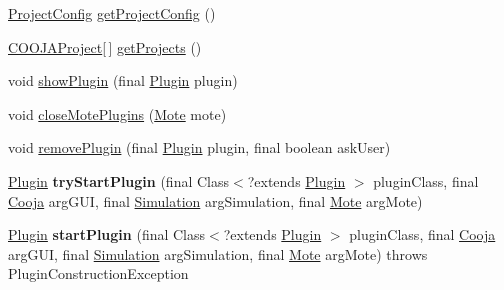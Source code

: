 \begin{DoxyCompactItemize}
\item 
\hyperlink{classorg_1_1contikios_1_1cooja_1_1ProjectConfig}{Project\-Config} \hyperlink{classorg_1_1contikios_1_1cooja_1_1Cooja_a57c3f5341a49924e2419b26ff374267f}{get\-Project\-Config} ()
\item 
\hyperlink{classorg_1_1contikios_1_1cooja_1_1COOJAProject}{C\-O\-O\-J\-A\-Project}\mbox{[}$\,$\mbox{]} \hyperlink{classorg_1_1contikios_1_1cooja_1_1Cooja_adda2fcf2fe42975c975859b062899434}{get\-Projects} ()
\item 
void \hyperlink{classorg_1_1contikios_1_1cooja_1_1Cooja_a16349cbb2017db876f1d5ef2bb6384c1}{show\-Plugin} (final \hyperlink{interfaceorg_1_1contikios_1_1cooja_1_1Plugin}{Plugin} plugin)
\item 
void \hyperlink{classorg_1_1contikios_1_1cooja_1_1Cooja_a366158a73ae30ab8b8a41b015c926022}{close\-Mote\-Plugins} (\hyperlink{interfaceorg_1_1contikios_1_1cooja_1_1Mote}{Mote} mote)
\item 
void \hyperlink{classorg_1_1contikios_1_1cooja_1_1Cooja_aa515697c688d47a06712703420558433}{remove\-Plugin} (final \hyperlink{interfaceorg_1_1contikios_1_1cooja_1_1Plugin}{Plugin} plugin, final boolean ask\-User)
\item 
\hypertarget{classorg_1_1contikios_1_1cooja_1_1Cooja_a1dfc83f2625490136b04d80bd7bec63c}{\hyperlink{interfaceorg_1_1contikios_1_1cooja_1_1Plugin}{Plugin} {\bfseries try\-Start\-Plugin} (final Class$<$?extends \hyperlink{interfaceorg_1_1contikios_1_1cooja_1_1Plugin}{Plugin} $>$ plugin\-Class, final \hyperlink{classorg_1_1contikios_1_1cooja_1_1Cooja}{Cooja} arg\-G\-U\-I, final \hyperlink{classorg_1_1contikios_1_1cooja_1_1Simulation}{Simulation} arg\-Simulation, final \hyperlink{interfaceorg_1_1contikios_1_1cooja_1_1Mote}{Mote} arg\-Mote)}\label{classorg_1_1contikios_1_1cooja_1_1Cooja_a1dfc83f2625490136b04d80bd7bec63c}

\item 
\hypertarget{classorg_1_1contikios_1_1cooja_1_1Cooja_a67e9f8928871005c0a13a0fddd337046}{\hyperlink{interfaceorg_1_1contikios_1_1cooja_1_1Plugin}{Plugin} {\bfseries start\-Plugin} (final Class$<$?extends \hyperlink{interfaceorg_1_1contikios_1_1cooja_1_1Plugin}{Plugin} $>$ plugin\-Class, final \hyperlink{classorg_1_1contikios_1_1cooja_1_1Cooja}{Cooja} arg\-G\-U\-I, final \hyperlink{classorg_1_1contikios_1_1cooja_1_1Simulation}{Simulation} arg\-Simulation, final \hyperlink{interfaceorg_1_1contikios_1_1cooja_1_1Mote}{Mote} arg\-Mote)  throws Plugin\-Construction\-Exception   }\label{classorg_1_1contikios_1_1cooja_1_1Cooja_a67e9f8928871005c0a13a0fddd337046}


\end{DoxyCompactItemize}
